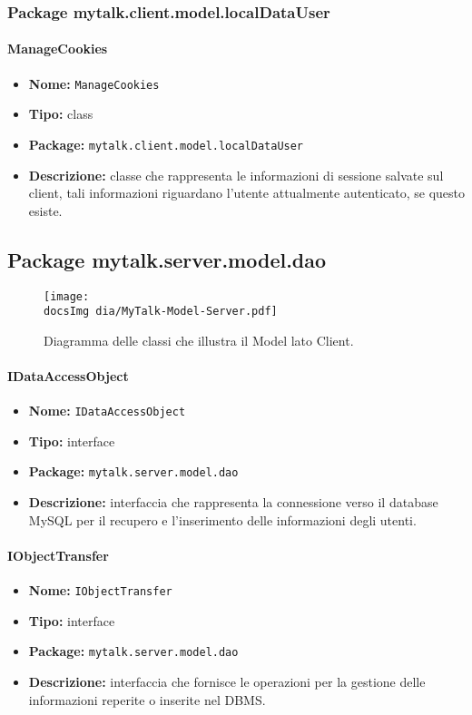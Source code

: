 \subsubsection{Package mytalk.client.model.localDataUser}

\paragraph{ManageCookies}{
	\begin{itemize}
		\item [] \textbf{Nome:} \texttt{ManageCookies}
		\item [] \textbf{Tipo:} class
		\item [] \textbf{Package:} \texttt{mytalk.client.model.localDataUser}
		\item [] \textbf{Descrizione:}{ classe che rappresenta le informazioni di sessione salvate sul client\g, tali informazioni riguardano l'utente attualmente autenticato, se questo esiste.}
	\end{itemize}
}

\subsection{Package mytalk.server.model.dao}

	\begin{figure}[h!tbp]
		\centering
		\texttt{[image: \\docsImg dia/MyTalk-Model-Server.pdf]}
		\caption{Diagramma delle classi che illustra il Model lato Client.}
	\end{figure}

\paragraph{IDataAccessObject}{
	\begin{itemize}
		\item [] \textbf{Nome:} \texttt{IDataAccessObject}
		\item [] \textbf{Tipo:} interface
		\item [] \textbf{Package:} \texttt{mytalk.server.model.dao}
		\item [] \textbf{Descrizione:}{ interfaccia che rappresenta la connessione verso il database\g~ MySQL per il recupero e l'inserimento delle informazioni degli utenti.}
	\end{itemize}
}

\paragraph{IObjectTransfer}{
	\begin{itemize}
		\item [] \textbf{Nome:} \texttt{IObjectTransfer}
		\item [] \textbf{Tipo:} interface
		\item [] \textbf{Package:} \texttt{mytalk.server.model.dao}
		\item [] \textbf{Descrizione:}{ interfaccia che fornisce le operazioni per la gestione delle informazioni reperite o inserite nel DBMS\g.}
	\end{itemize}
}

